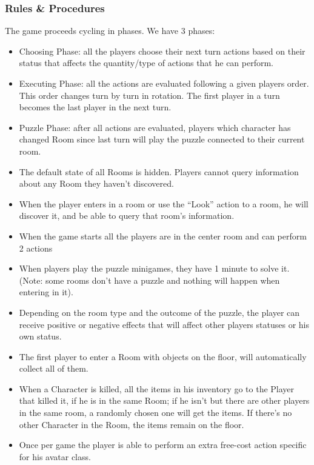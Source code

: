 \subsubsection{Rules \& Procedures}
The game proceeds cycling in phases. We have 3 phases:
\begin{itemize}
	\item Choosing Phase: all the players choose their next turn actions based on their status that affects the quantity/type of actions that he can perform.
	\item Executing Phase: all the actions are evaluated following a given players order. This order changes turn by turn in rotation. The first player in a turn becomes the last player in the next turn.
	\item Puzzle Phase: after all actions are evaluated, players which character has changed Room since last turn will play the puzzle connected to their current room.
\end{itemize}

\begin{itemize}
	\item The default state of all Rooms is hidden. Players cannot query information about any Room they haven't discovered.
	\item When the player enters in a room or use the “Look” action to a room, he will discover it, and be able to query that room's information.
	\item When the game starts all the players are in the center room and can perform 2 actions
	\item When players play the puzzle minigames, they have 1 minute to solve it. (Note: some rooms don’t have a puzzle and nothing will happen when entering in it).
	\item Depending on the room type and the outcome of the puzzle, the player can receive positive or negative effects that will affect other players statuses or his own status.
	\item The first player to enter a Room with objects on the floor, will automatically collect all of them.
	\item When a Character is killed, all the items in his inventory go to the Player that killed it, if he is in the same Room; if he isn't but there are other players in the same room, a randomly chosen one will get the items. If there's no other Character in the Room, the items remain on the floor.
	\item Once per game the player is able to perform an extra free-cost action specific for his avatar class.
\end{itemize}